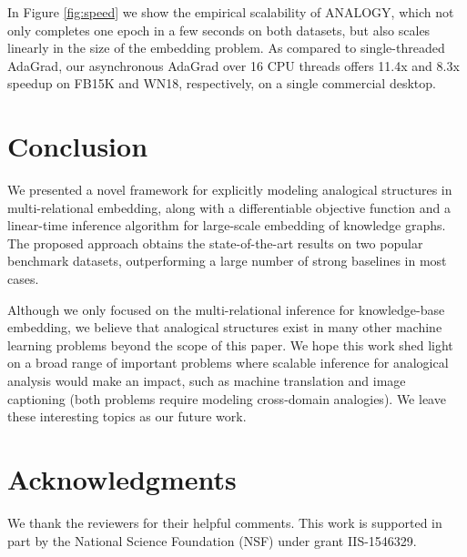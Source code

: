 \documentclass{article}
\begin{document}
In Figure \ref{fig:speed} we show the empirical scalability of ANALOGY,
which not only completes one epoch in a few seconds on both datasets, 
but also scales linearly in the size of the embedding problem.
As compared to single-threaded AdaGrad,
our asynchronous AdaGrad over 16 CPU threads
offers 11.4x and 8.3x speedup on FB15K and WN18, respectively,
on a single commercial desktop.


 \section{Conclusion}
\label{sec:conclusion}
We presented a novel framework for explicitly modeling analogical structures in multi-relational embedding, along with a differentiable objective function and a linear-time inference algorithm for large-scale embedding of knowledge graphs.
The proposed approach obtains the state-of-the-art results on two popular benchmark datasets, outperforming a large number of strong baselines in most cases. 


Although we only focused on the multi-relational inference for knowledge-base embedding, we believe that analogical structures exist in many other machine learning problems beyond the scope of this paper. We hope this work shed light on a broad range of important problems where scalable inference for analogical analysis would make an impact,
such as machine translation and image captioning (both problems require modeling cross-domain analogies).  We leave these interesting topics as our future work.
 
\section*{Acknowledgments}
We thank the reviewers for their helpful comments. This work is supported in part by the National Science Foundation (NSF) under grant IIS-1546329.




\end{document}

